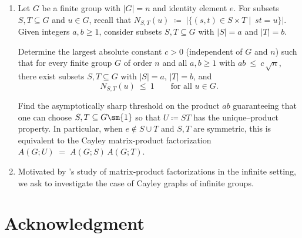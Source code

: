 \documentclass{file}
\begin{document}
\begin{enumerate}
We are interested in the factorization problem for $k$-uniform hypergraphs under this adjacency:
in particular, in the case of block designs. If $\mathcal H$ is a $2$-$(v,k,\lambda)$ design
(i.e., every pair of distinct vertices lies in exactly $\lambda$ blocks of size $k$), then
\[
A(\mathcal H)=\lambda\,(J-I),
\]
where $J$ and $I$ denote the $v\times v$ all-ones and identity matrices, respectively.
It is worth mentioning that this case has been studied here \citet{li2025cyclotomic,kreher2025lambda}.

\begin{op}Classify the factorizations of $\lambda(J-I)$ as a product of adjacency
matrices of (simple, uniform) hypergraphs on $V$; that is, determine all pairs
$\mathcal H_1,\mathcal H_2$ on $V$ such that
\[
A(\mathcal H_1)\,A(\mathcal H_2)\;=\;\lambda\,(J-I).
\]
\end{op}
\item
Let $G$ be a finite group with $|G|=n$ and identity element $e$. For subsets $S,T\subseteq G$ and $u\in G$, recall that 
$N_{S,T}(u)\;\coloneqq \;\bigl|\{(s,t)\in S\times T\mid \ st=u\}\bigr|$.
Given integers $a,b\ge 1$, consider subsets $S,T\subseteq G$ with $|S|=a$ and $|T|=b$.

\begin{op}
Determine the largest absolute constant $c>0$ (independent of $G$ and $n$) such that for every finite group $G$ of order $n$ and all $a,b\ge 1$ with
$ab\ \le\ c\,\sqrt{n}$,
there exist subsets $S,T\subseteq G$ with $|S|=a$, $|T|=b$, and
\[
N_{S,T}(u)\ \le\ 1\qquad\text{for all }u\in G.
\]
\end{op}
\begin{op}
Find the asymptotically sharp threshold on the product $ab$ guaranteeing that one can choose $S,T\subseteq G\sm\{1\}$ so that $U\coloneqq ST$ has the unique–product property. In particular, when $e\notin S\cup T$ and $S,T$ are symmetric, this is equivalent to the Cayley matrix-product factorization
$A(G;U)\;=\;A(G;S)\,A(G;T)$.
\end{op}

\item Motivated by \citet{miraftab2025factorability}'s study of matrix‑product factorizations in the infinite setting, we ask to investigate the case of Cayley graphs of infinite groups.
\end{enumerate}



\section*{Acknowledgment}
\end{document}
